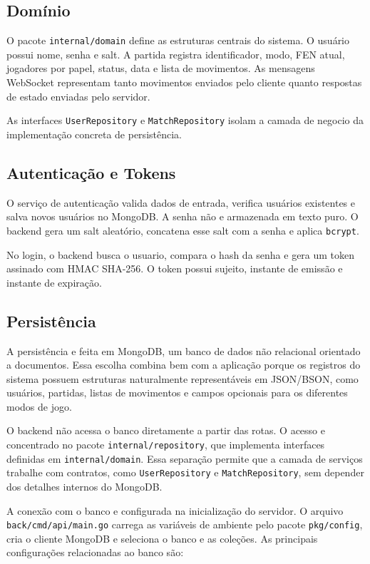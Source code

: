\documentclass[12pt]{article}
\begin{document}
\subsection{Domínio}

O pacote \texttt{internal/domain} define as estruturas centrais do sistema. O usuário possui nome, senha e salt. A partida registra identificador, modo, FEN atual, jogadores por papel, status, data e lista de movimentos. As mensagens WebSocket representam tanto movimentos enviados pelo cliente quanto respostas de estado enviadas pelo servidor.

As interfaces \texttt{UserRepository} e \texttt{MatchRepository} isolam a camada de negocio da implementação concreta de persistência.

\subsection{Autenticação e Tokens}

O serviço de autenticação valida dados de entrada, verifica usuários existentes e salva novos usuários no MongoDB. A senha não e armazenada em texto puro. O backend gera um salt aleatório, concatena esse salt com a senha e aplica \texttt{bcrypt}.

No login, o backend busca o usuario, compara o hash da senha e gera um token assinado com HMAC SHA-256. O token possui sujeito, instante de emissão e instante de expiração.

\subsection{Persistência}

A persistência e feita em MongoDB, um banco de dados não relacional orientado a documentos. Essa escolha combina bem com a aplicação porque os registros do sistema possuem estruturas naturalmente representáveis em JSON/BSON, como usuários, partidas, listas de movimentos e campos opcionais para os diferentes modos de jogo.

O backend não acessa o banco diretamente a partir das rotas. O acesso e concentrado no pacote \texttt{internal/repository}, que implementa interfaces definidas em \texttt{internal/domain}. Essa separação permite que a camada de serviços trabalhe com contratos, como \texttt{UserRepository} e \texttt{MatchRepository}, sem depender dos detalhes internos do MongoDB.

A conexão com o banco e configurada na inicialização do servidor. O arquivo \texttt{back/cmd/api/main.go} carrega as variáveis de ambiente pelo pacote \texttt{pkg/config}, cria o cliente MongoDB e seleciona o banco e as coleções. As principais configurações relacionadas ao banco são:
\end{document}
